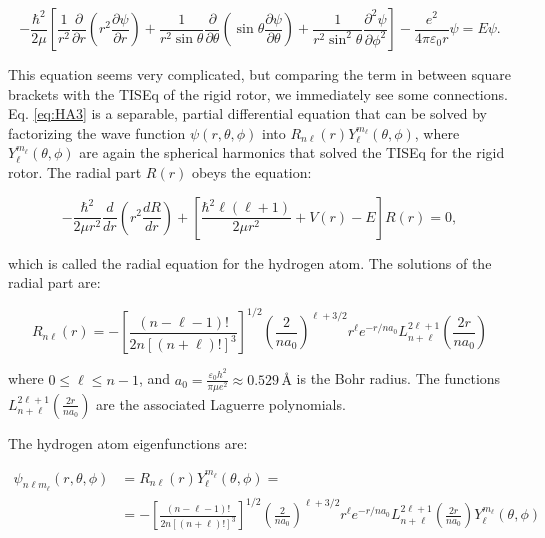 \documentclass[
  english,
  9pt,
]{extbook}
\theoremstyle{definition}
\theoremstyle{definition}
\theoremstyle{definition}
\theoremstyle{definition}
\theoremstyle{remark}
\begin{document}
\begin{equation}
-{\frac {\hbar ^{2}}{2\mu }}\left[{\frac {1}{r^{2}}}{\frac {\partial }{\partial r}}\left(r^{2}{\frac {\partial \psi }{\partial r}}\right)+{\frac {1}{r^{2}\sin \theta }}{\frac {\partial }{\partial \theta }}\left(\sin \theta {\frac {\partial \psi }{\partial \theta }}\right)+{\frac {1}{r^{2}\sin ^{2}\theta }}{\frac {\partial ^{2}\psi }{\partial \phi ^{2}}}\right]-{\frac {e^{2}}{4\pi \varepsilon _{0}r}}\psi =E\psi.
\label{eq:HA3}
\end{equation}

This equation seems very complicated, but comparing the term in between square brackets with the TISEq of the rigid rotor, we immediately see some connections. Eq. \eqref{eq:HA3} is a separable, partial differential equation that can be solved by factorizing the wave function \(\psi(r, \theta, \phi)\) into \(R_{n\ell}(r)Y_{\ell}^{m_{\ell}}(\theta, \phi)\), where \(Y_{\ell}^{m_{\ell}}(\theta, \phi)\) are again the spherical harmonics that solved the TISEq for the rigid rotor. The radial part \(R(r)\) obeys the equation:

\begin{equation}
- \frac{\hbar^2}{2 \mu r^2} \frac{d}{dr} \left( r^2 \frac{dR}{dr}
\right) + \left[\frac{\hbar^2 \ell(\ell+1)}{2 \mu r^2} + V(r) - E \right] R(r) = 0,
\label{eq:HA4}
\end{equation}

which is called the radial equation for the hydrogen atom. The solutions of the radial part are:

\begin{equation}
R_{n\ell}(r) = - \left[ \frac{(n - \ell - 1)!}{2n[(n+\ell)!]^3} \right]^{1/2}\left(\frac{2}{na_0}\right)^{\ell+3/2}r^{\ell} e^{-r/na_0} L_{n+\ell}^{2\ell+1}
\left( \frac{2r}{n a_0} \right)
\label{eq:HA5}
\end{equation}

where \(0 \leq \ell \leq n - 1\), and \(a_0 = \frac{\varepsilon_0 h^2}{\pi \mu e^2} \approx 0.529\,\text{Å}\) is the Bohr radius. The functions \(L_{n+\ell}^{2\ell+1}\left(\frac{2r}{na_0}\right)\) are the associated Laguerre polynomials.

The hydrogen atom eigenfunctions are:

\begin{equation}
\begin{aligned}
\psi_{n\ell m_{\ell}}(r,\theta,\phi) &= R_{n\ell}(r)Y_{\ell}^{m_{\ell}}(\theta,\phi) = \\
&= - \left[ \frac{(n - \ell - 1)!}{2n[(n+\ell)!]^3} \right]^{1/2}\left(\frac{2}{na_0}\right)^{\ell+3/2}r^{\ell} e^{-r/na_0} L_{n+\ell}^{2\ell+1}
\left( \frac{2r}{n a_0} \right) Y_{\ell}^{m_{\ell}}(\theta,\phi)
\end{aligned}
\label{eq:HA6}
\end{equation}
\end{document}
